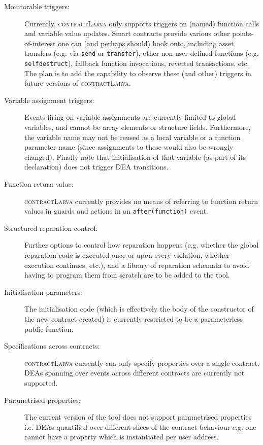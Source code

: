 \documentclass{article}
\newcommand{\contractlarva}{\textsc{contractLarva}\xspace}
\begin{document}
  \begin{description}
    \item[Monitorable triggers:] Currently, \contractlarva only supports triggers on (named) function calls and variable value updates. Smart contracts provide various other points-of-interest one can (and perhaps should) hook onto, including asset transfers (e.g. via \texttt{send} or \texttt{transfer}), other non-user defined functions (e.g. \texttt{selfdestruct}), fallback function invocations, reverted transactions, etc. The plan is to add the capability to observe these (and other) triggers in future versions of \contractlarva.   
    \item[Variable assignment triggers:] Events firing on variable assignments are currently limited to global variables, and cannot be array elements or structure fields. Furthermore, the variable name may not be reused as a local variable or a function parameter name (since assignments to these would also be wrongly changed). Finally note that initialisation of that variable (as part of its declaration) does not trigger DEA transitions.
    \item[Function return value:] \contractlarva currently provides no means of referring to function return values in guards and actions in an \texttt{after(function)} event.
    \item[Structured reparation control:] Further options to control how reparation happens (e.g. whether the global reparation code is executed once or upon every violation, whether execution continues, etc.), and a library of reparation schemata to avoid having to program them from scratch are to be added to the tool. 
    \item[Initialisation parameters:] The initialisation code (which is effectively the body of the constructor of the new contract created) is currently restricted to be a parameterless public function.
    \item[Specifications across contracts:] \contractlarva currently can only specify properties over a single contract. DEAs spanning over events across different contracts are currently not supported. 
    \item[Parametrised properties:] The current version of the tool does not support parametrised properties i.e. DEAs quantified over different slices of the contract behaviour e.g. one cannot have a property which is instantiated per user address. 
  \end{description}
  
\end{document}
